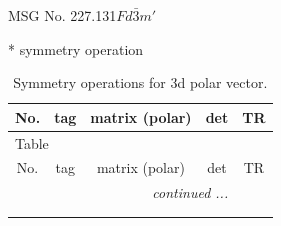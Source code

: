 \documentclass[fleqn,8pt]{jsarticle}
\begin{document}
\setcounter{MaxMatrixCols}{32}

\renewcommand{\tablename}{Table~}
\renewcommand{\figurename}{Figure~}
\begin{center}
\LARGE
MSG No. 227.131\quad$Fd\bar{3}m'$
\end{center}
* symmetry operation
\renewcommand{\arraystretch}{1.3}
\begin{longtable}{ccccc}
\caption{Symmetry operations for 3d polar vector.}
 \\
 \hline \hline
No. & tag & matrix (polar) & det & TR \\ \hline \endfirsthead

\multicolumn{4}{l}{\tablename\ \thetable{}} \\
 \hline \hline
No. & tag & matrix (polar) & det & TR \\ \hline \endhead

 \hline \hline
\multicolumn{4}{r}{\footnotesize\it continued ...} \\ \endfoot

 \hline \hline
\multicolumn{4}{r}{} \\ \endlastfoot


\end{longtable}
\end{document}
